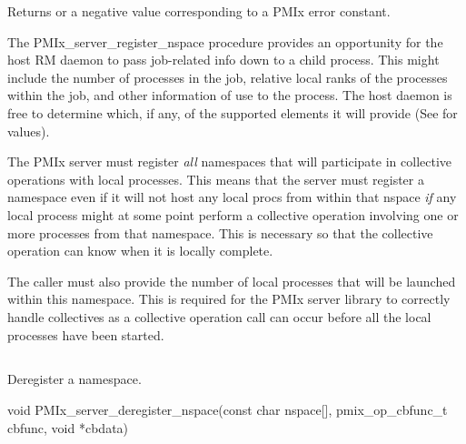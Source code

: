 Returns  or a negative value corresponding to a PMIx error constant.

\descr

The PMIx_server_register_nspace procedure provides an opportunity for the host \ac{RM} daemon to pass job-related info down to a child process.
This might include the number of processes in the job, relative local ranks of the processes within the job, and other information of use to the process.
The host daemon is free to determine which, if any, of the supported elements it will provide (See  for values).

The PMIx server must register \emph{all} namespaces that will participate in collective operations with local processes.
This means that the server must register a namespace even if it will not host any local procs from within that nspace \emph{if} any local process might at some point perform a collective operation involving one or more processes from that namespace.
This is necessary so that the collective operation can know when it is locally complete.

The caller must also provide the number of local processes that will be launched within this namespace.
This is required for the PMIx server library to correctly handle collectives as a collective operation call can occur before all the local processes have been started.


\subsection{}

\summary

Deregister a namespace.

\format

\cspecificstart
\begin{codepar}
void PMIx_server_deregister_nspace(const char nspace[],
                                   pmix_op_cbfunc_t cbfunc, void *cbdata)
\end{codepar}
\cspecificend

\begin{arglist}
\end{arglist}

